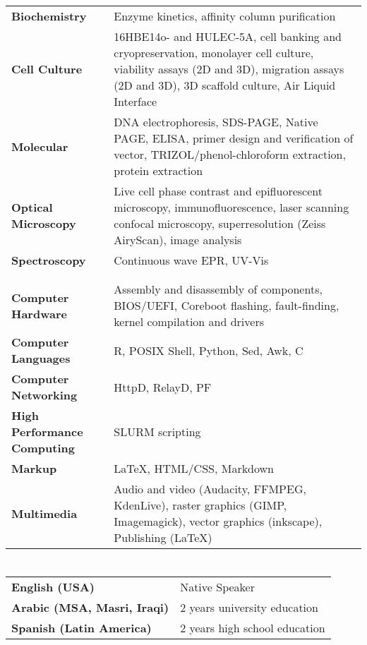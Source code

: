 \documentclass[11pt]{article}
\begin{document}
\section*{\color{secondary}{Technical Skills}}
	\begin{longtable}{p{}p{}}
		\textbf{Biochemistry} & {Enzyme kinetics, affinity column purification} \\ 
		\textbf{Cell Culture} & {16HBE14o- and HULEC-5A, cell banking and cryopreservation,
		monolayer cell culture, viability assays (2D and 3D), migration assays (2D and 3D), 3D scaffold
		culture, Air Liquid Interface} \\ 
		\textbf{Molecular} & DNA electrophoresis, SDS-PAGE, Native PAGE, ELISA, primer design and
		verification of vector, TRIZOL/phenol-chloroform extraction, protein extraction \\ 
		\textbf{Optical Microscopy} & Live cell phase contrast and epifluorescent microscopy, immunofluorescence,
		laser scanning confocal microscopy, superresolution (Zeiss AiryScan), image analysis \\
		\textbf{Spectroscopy} & Continuous wave EPR, UV-Vis \\ 
		 & \\ 
		 & \\ 
		\textbf{Computer Hardware} & Assembly and disassembly of components, BIOS/UEFI, Coreboot
		flashing, fault-finding, kernel compilation and drivers \\
		\textbf{Computer Languages} & R, POSIX Shell, Python, Sed, Awk, C \\
		\textbf{Computer Networking} & HttpD, RelayD, PF \\ 
		\textbf{High Performance Computing} & SLURM scripting \\ 
		\textbf{Markup} & \LaTeX, HTML/CSS, Markdown \\ 
		\textbf{Multimedia} & Audio and video (Audacity, FFMPEG, KdenLive), 
			raster graphics (GIMP, Imagemagick),
			vector graphics (inkscape),
			Publishing (\LaTeX)
	\end{longtable}
		
\section*{\color{secondary}{Languages}}
	\begin{longtable}{p{}p{}}
		\textbf{English (USA)} & Native Speaker \\
		\textbf{Arabic (MSA, Masri, Iraqi)} & 2 years university education \\
		\textbf{Spanish (Latin America)} & 2 years high school education \\ 
	\end{longtable}
        
\end{document}

